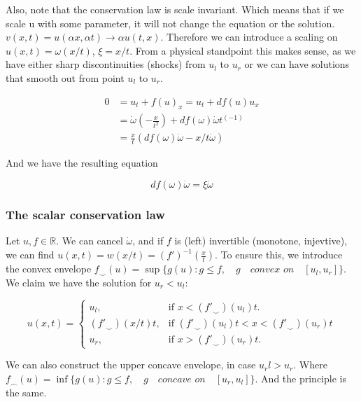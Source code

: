 \documentclass{article}
\numberwithin{equation}{section}
\begin{document}
 Also, note that the conservation law is scale invariant. Which means that if we scale u with some parameter, it will not change the equation or the solution. $v(x,t) = u(\alpha x, \alpha t) \rightarrow \alpha u(t,x)$. Therefore we can introduce a scaling on $u(x,t) = \omega (x/t) $, $ \xi = x/t$. From a physical standpoint this makes sense, as we have either sharp discontinuities (shocks) from $u_l$ to $u_r$ or we can have solutions that smooth out from point $u_l$ to $u_r$. 

 \begin{equation*}
     \begin{split}
         0 &= u_t + f(u)_x = u_t + df(u)u_x \\
           &= \dot \omega( -\frac{x}{t^2}) + df( \omega) \dot \omega t^(-1) \\
           &= \frac{x}{t}(  df( \omega) \dot \omega - x/t \dot \omega )
     \end{split}
 \end{equation*}
 
 And we have the resulting equation 
 
 \begin{equation}
     df( \omega) \dot \omega =  \xi \dot \omega
 \end{equation}
 

\subsubsection{The scalar conservation law}
Let $u,f \in \mathbb{R}$. We can cancel $\dot \omega $, and if $f$ is (left) invertible (monotone, injevtive), we can find $u(x,t) = w(x/t) = (f')^{-1}(\frac{x}{t})$. 
To ensure this, we introduce the convex envelope $f_{\smile}(u) = \sup\{g(u) : g\leq f, \quad  g \quad \textit{convex on}\quad [u_l, u_r]\} $. We claim we have the solution for $u_r < u_l$:
	 
 \begin{equation}
     u(x,t) = \begin{cases} u_l, & \text{if $x < (f'_{\smile} )(u_l)t$}.\\
                            (f'_{\smile} )(x/t)t, & \text{if $(f'_{\smile} )(u_l)t$} < x < (f'_{\smile} )(u_r)t\\ 
                            u_r, & \text{if $x > (f'_{\smile} )(u_r)t$}. 
     \end{cases}
     \label{ScalarRiemannSol}
 \end{equation}
 
We can also construct the upper concave envelope, in case $u_rl > u_r$. Where $f_{\frown}(u) = \inf\{g(u) : g\leq f, \quad g \quad \textit{concave on} \quad  [u_r, u_l]\} $. And the principle is the same. 
    
\end{document}
